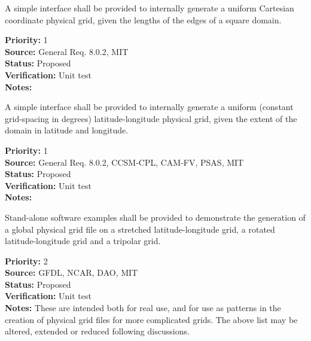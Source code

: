A simple interface shall be provided to internally generate a uniform Cartesian
coordinate physical grid, given the lengths of the edges of a square domain.
\begin{reqlist}
{\bf Priority:} 1 \\
{\bf Source:} General Req. 8.0.2, MIT \\
{\bf Status:} Proposed \\
{\bf Verification:} Unit test\\
{\bf Notes:} 
\end{reqlist}

A simple interface shall be provided to internally generate a uniform (constant
grid-spacing in degrees) latitude-longitude physical grid, given the extent of the domain
in latitude and longitude.                                                           
\begin{reqlist}
{\bf Priority:} 1 \\
{\bf Source:} General Req. 8.0.2, CCSM-CPL, 
CAM-FV, PSAS, MIT \\
{\bf Status:} Proposed \\
{\bf Verification:} Unit test\\
{\bf Notes:} 
\end{reqlist}

Stand-alone software examples shall be provided to demonstrate the generation of a
global physical grid file on a stretched latitude-longitude grid, a rotated
latitude-longitude grid and a tripolar grid. 
\begin{reqlist}
{\bf Priority:} 2 \\
{\bf Source:} GFDL, NCAR, 
DAO, MIT \\
{\bf Status:} Proposed \\
{\bf Verification:} Unit test\\
{\bf Notes:} These are intended both for real use, and for use as patterns in the
creation of physical grid files for more complicated grids.  The above list may be
altered, extended or reduced following discussions.
\end{reqlist}

